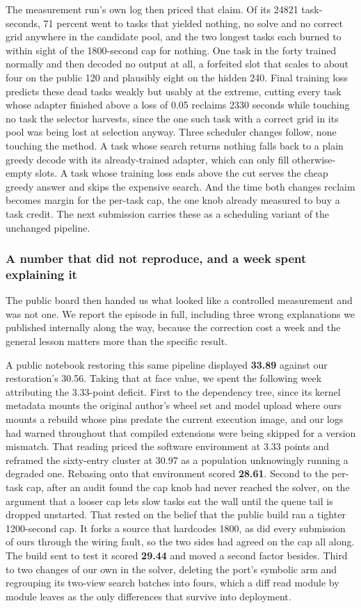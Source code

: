 \documentclass[11pt]{article}
\begin{document}
The measurement run's own log then priced that claim. Of its 24821 task-seconds, 71 percent went to tasks
that yielded nothing, no solve and no correct grid anywhere in the candidate pool, and the two longest
tasks each burned to within sight of the 1800-second cap for nothing. One task in the forty trained
normally and then decoded no output at all, a forfeited slot that scales to about four on the public 120
and plausibly eight on the hidden 240. Final training loss predicts these dead tasks weakly but usably at
the extreme, cutting every task whose adapter finished above a loss of 0.05 reclaims 2330 seconds while
touching no task the selector harvests, since the one such task with a correct grid in its pool was being
lost at selection anyway. Three scheduler changes follow, none touching the method. A task whose search
returns nothing falls back to a plain greedy decode with its already-trained adapter, which can only fill
otherwise-empty slots. A task whose training loss ends above the cut serves the cheap greedy answer and
skips the expensive search. And the time both changes reclaim becomes margin for the per-task cap, the one
knob already measured to buy a task credit. The next submission carries these as a scheduling variant of
the unchanged pipeline.

\subsubsection{A number that did not reproduce, and a week spent explaining it}
\label{sec:phantom}
The public board then handed us what looked like a controlled measurement and was not one. We report the
episode in full, including three wrong explanations we published internally along the way, because the
correction cost a week and the general lesson matters more than the specific result.

A public notebook restoring this same pipeline displayed \textbf{33.89} against our restoration's 30.56.
Taking that at face value, we spent the following week attributing the 3.33-point deficit. First to the
dependency tree, since its kernel metadata mounts the original author's wheel set and model upload where
ours mounts a rebuild whose pins predate the current execution image, and our logs had warned throughout
that compiled extensions were being skipped for a version mismatch. That reading priced the software
environment at 3.33 points and reframed the sixty-entry cluster at 30.97 as a population unknowingly
running a degraded one. Rebasing onto that environment scored \textbf{28.61}. Second to the per-task cap,
after an audit found the cap knob had never reached the solver, on the argument that a looser cap lets
slow tasks eat the wall until the queue tail is dropped unstarted. That rested on the belief that the
public build ran a tighter 1200-second cap. It forks a source that hardcodes 1800, as did every
submission of ours through the wiring fault, so the two sides had agreed on the cap all along. The build
sent to test it scored \textbf{29.44} and moved a second factor besides. Third to two changes of our own
in the solver, deleting the port's symbolic arm and regrouping its two-view search batches into fours,
which a diff read module by module leaves as the only differences that survive into deployment.
\end{document}
